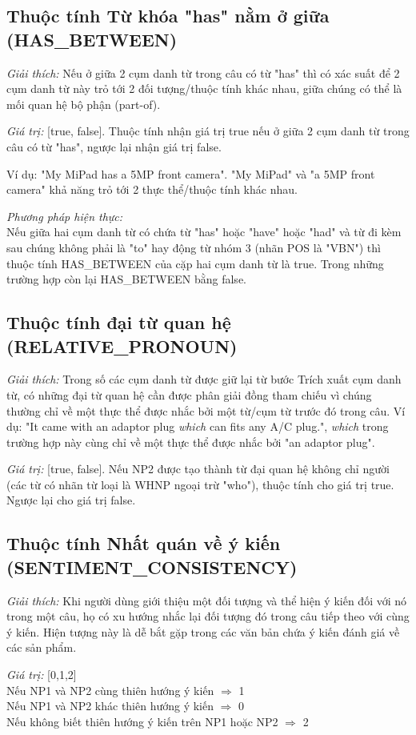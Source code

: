 \documentclass[12pt]{report}
\begin{document}
			\subsection*{Thuộc tính Từ khóa "has" nằm ở giữa (HAS\_BETWEEN)}
				\par \textit{Giải thích:} Nếu ở giữa 2 cụm danh từ trong câu có từ "has" thì có xác suất để 2 cụm danh từ này trỏ tới 2 đối tượng/thuộc tính khác nhau, giữa chúng có thể là mối quan hệ bộ phận (part-of). 
				\par \textit{Giá trị:} [true, false]. Thuộc tính nhận giá trị true nếu ở giữa 2 cụm danh từ trong câu có từ "has", ngược lại nhận giá trị false.
				\par Ví dụ:
				"My MiPad has a 5MP front camera". "My MiPad" và "a 5MP front camera" khả năng trỏ tới 2 thực thể/thuộc tính khác nhau.
								
				\par \textit{Phương pháp hiện thực:}
				\\Nếu giữa hai cụm danh từ có chứa từ "has" hoặc "have" hoặc "had" và từ đi kèm sau chúng không phải là "to" hay động từ nhóm 3 (nhãn POS là "VBN") thì thuộc tính HAS\_BETWEEN của cặp hai cụm danh từ là true. Trong những trường hợp còn lại HAS\_BETWEEN bằng false.

			\subsection*{Thuộc tính đại từ quan hệ (RELATIVE\_PRONOUN)}
				\par \textit{Giải thích:} Trong số các cụm danh từ được giữ lại từ bước Trích xuất cụm danh từ, có những đại từ quan hệ cần được phân giải đồng tham chiếu vì chúng thường chỉ về một thực thể được nhắc bởi một từ/cụm từ trước đó trong câu. Ví dụ: "It came with an adaptor plug \textit{which} can fits any A/C plug.", \textit{which} trong trường hợp này cùng chỉ về một thực thể được nhắc bởi "an adaptor plug".
				\par \textit{Giá trị:} [true, false]. Nếu NP2 được tạo thành từ đại quan hệ không chỉ người (các từ có nhãn từ loại là WHNP ngoại trừ "who"), thuộc tính cho giá trị true. Ngược lại cho giá trị false. 
 
			\subsection*{Thuộc tính Nhất quán về ý kiến (SENTIMENT\_CONSISTENCY)}
				\par \textit{Giải thích:} Khi người dùng giới thiệu một đối tượng và thể hiện ý kiến đối với nó trong một câu, họ có xu hướng nhắc lại đối tượng đó trong câu tiếp theo với cùng ý kiến. Hiện tượng này là dễ bắt gặp trong các văn bản chứa ý kiến đánh giá về các sản phẩm.
				\par \textit{Giá trị:} [0,1,2]
				\\Nếu NP1 và NP2 cùng thiên hướng ý kiến $\Rightarrow$ 1
				\\Nếu NP1 và NP2 khác thiên hướng ý kiến $\Rightarrow$ 0
				\\Nếu không biết thiên hướng ý kiến trên NP1 hoặc NP2 $\Rightarrow$ 2
\end{document}
